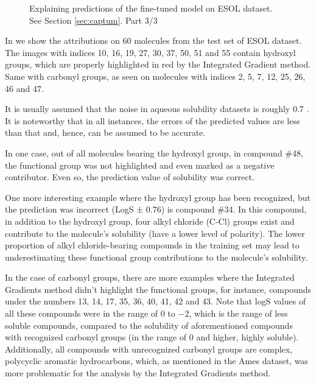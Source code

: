 \begin{figure}[h]
\caption{Explaining predictions of the fine-tuned model on ESOL dataset. See Section \ref{sec:captum}. Part 3/3}
\label{fig:captum-esol-3}
\end{figure}

In  we show the attributions on $60$ molecules from the test set of ESOL dataset. The images with indices 10, 16, 19, 27, 30, 37, 50, 51 and 55 contain hydroxyl groups, which are properly highlighted in red by the Integrated Gradient method. Same with carbonyl groups, as seen on molecules with indices 2, 5, 7, 12,%
25, 26, 46 and 47.



It is usually assumed that the noise in aqueous solubility datasets is roughly 0.7 \citet{ml-solubility-noise}. It is noteworthy that in all instances, the errors of the predicted values are less than that and, hence, can be assumed to be accurate. %

In one case, out of all molecules bearing the hydroxyl group, in compound \#48, the functional group was not highlighted and even marked as a negative contributor. Even so, the prediction value of solubility was correct. 

One more interesting example where the hydroxyl group has been recognized, but the prediction was incorrect (LogS ± 0.76) is compound \#34. In this compound, in addition to the hydroxyl group, four alkyl chloride (C-Cl) groups exist and contribute to the molecule's solubility (have a lower level of polarity). The lower proportion of alkyl chloride-bearing compounds in the training set may lead to underestimating these functional group contributions to the molecule's solubility. 

In the case of carbonyl groups, there are more examples where the Integrated Gradients method didn't highlight the functional groups, for instance, compounds under the numbers 13, 14, 17, 35, 36, 40, 41, 42 and 43. Note that logS values of all these compounds were in the range of 0 to $-2$, which is the range of less soluble compounds, compared to the solubility of aforementioned compounds with recognized carbonyl groups (in the range of 0 and higher, highly soluble).
Additionally, all compounds with unrecognized carbonyl groups are complex, polycyclic aromatic hydrocarbons, which, as mentioned in the Ames dataset, was more problematic for the analysis by the Integrated Gradients method. 


